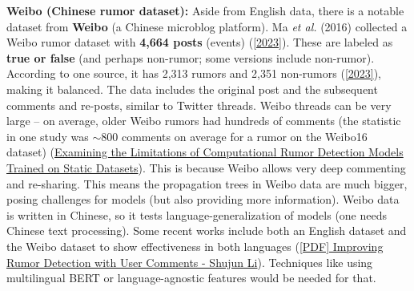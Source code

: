 \documentclass[12pt,a4paper]{report}
\begin{document}
\textbf{Weibo (Chinese rumor dataset):} Aside from English data, there is a notable dataset from \textbf{Weibo} (a Chinese microblog platform). Ma \textit{et al.} (2016) collected a Weibo rumor dataset with \textbf{4,664 posts} (events) (\href{https://aclanthology.org/2023.findings-eacl.55.pdf#:~:text=Weibo%3A%20This%20dataset%20includes%204%2C664,2016}{[2023]}). These are labeled as \textbf{true or false} (and perhaps non-rumor; some versions include non-rumor). According to one source, it has 2,313 rumors and 2,351 non-rumors (\href{https://aclanthology.org/2023.findings-eacl.55.pdf#:~:text=Weibo%3A%20This%20dataset%20includes%204%2C664,2016}{[2023]}), making it balanced. The data includes the original post and the subsequent comments and re-posts, similar to Twitter threads. Weibo threads can be very large – on average, older Weibo rumors had hundreds of comments (the statistic in one study was \(\sim800\) comments on average for a rumor on the Weibo16 dataset) (\href{https://arxiv.org/html/2309.11576v2#:~:text=Average%20length%20of%20posts%2019,%E2%80%98S%E2%80%99%20denote%20comment%20propagation%20network}{Examining the Limitations of Computational Rumor Detection Models Trained on Static Datasets}). This is because Weibo allows very deep commenting and re-sharing. This means the propagation trees in Weibo data are much bigger, posing challenges for models (but also providing more information). Weibo data is written in Chinese, so it tests language-generalization of models (one needs Chinese text processing). Some recent works include both an English dataset and the Weibo dataset to show effectiveness in both languages (\href{http://www.hooklee.com/Papers/TrustCom2022.pdf#:~:text=Li%20www,and%20two%20of%20the}{[PDF] Improving Rumor Detection with User Comments - Shujun Li}). Techniques like using multilingual BERT or language-agnostic features would be needed for that.
\end{document}

